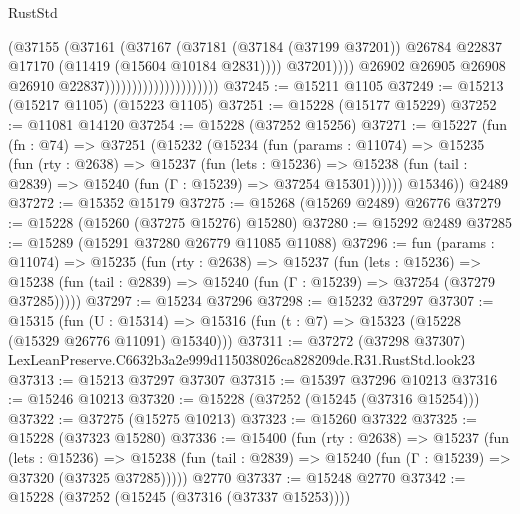 \begin{lexlean}{RustStd}
\begin{coremodule}
                                                  (@37155
                                                    (@37161
                                                      (@37167
                                                        (@37181
                                                          (@37184 (@37199 @37201))
                                                          @26784
                                                          @22837
                                                          @17170
                                                          (@11419 (@15604 @10184 @2831))))
                                                      @37201))))
                                              @26902
                                              @26905
                                              @26908
                                              @26910
                                              @22837)))))))))))))))))))))
@37245 := @15211 @1105
@37249 := @15213 (@15217 @1105) (@15223 @1105)
@37251 := @15228 (@15177 @15229)
@37252 := @11081 @14120
@37254 := @15228 (@37252 @15256)
@37271 := @15227
    (fun (fn : @74) =>
    @37251
      (@15232
        (@15234
          (fun (params : @11074) =>
          @15235
            (fun (rty : @2638) =>
            @15237
              (fun (lets : @15236) =>
              @15238 (fun (tail : @2839) => @15240 (fun (Γ : @15239) => @37254 @15301))))))
        @15346))
    @2489
@37272 := @15352 @15179
@37275 := @15268 (@15269 @2489) @26776
@37279 := @15228 (@15260 (@37275 @15276) @15280)
@37280 := @15292 @2489
@37285 := @15289 (@15291 @37280 @26779 @11085 @11088)
@37296 := fun (params : @11074) =>
  @15235
    (fun (rty : @2638) =>
    @15237
      (fun (lets : @15236) =>
      @15238 (fun (tail : @2839) => @15240 (fun (Γ : @15239) => @37254 (@37279 @37285)))))
@37297 := @15234 @37296
@37298 := @15232 @37297
@37307 := @15315
    (fun (U : @15314) => @15316 (fun (t : @7) => @15323 (@15228 (@15329 @26776 @11091) @15340)))
@37311 := @37272
    (@37298 @37307)
    LexLeanPreserve.C6632b3a2e999d115038026ca828209de.R31.RustStd.look23
@37313 := @15213 @37297 @37307
@37315 := @15397 @37296 @10213
@37316 := @15246 @10213
@37320 := @15228 (@37252 (@15245 (@37316 @15254)))
@37322 := @37275 (@15275 @10213)
@37323 := @15260 @37322
@37325 := @15228 (@37323 @15280)
@37336 := @15400
    (fun (rty : @2638) =>
    @15237
      (fun (lets : @15236) =>
      @15238 (fun (tail : @2839) => @15240 (fun (Γ : @15239) => @37320 (@37325 @37285)))))
    @2770
@37337 := @15248 @2770
@37342 := @15228 (@37252 (@15245 (@37316 (@37337 @15253))))

\end{coremodule}
\end{lexlean}
